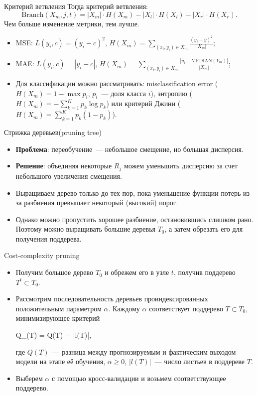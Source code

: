 \documentclass[notheorems, handout]{beamer}
\begin{document}
\begin{frame}{Критерий ветвления}
	Тогда критерий ветвления:
	\[
	\mathrm{Branch} (X _m, j, t) = |X _m| \cdot H(X _m) - |X _l| \cdot H(X _l) - |X _r| \cdot H(X _r).
	\]
	Чем больше изменение метрики, тем лучше.

	\begin{itemize}
		\item MSE: $L (y _i, c) = (y _i - c) ^2$, $H (X _m) = \sum \limits _{(x _i, y _i) \in X _m} \frac {(y _i - \overline{y}) ^2} {|X _m|}$;
		\item MAE: $L (y _i, c) = |y _i - c|$, $H (X _m) = \sum \limits _{(x _i, y _i) \in X _m} \frac {|y _i - \mathrm{MEDIAN}(Y _m)|} {|X _m|}$;
		\item Для классификации можно рассматривать: misclassification error ($H (X _m) = 1 - \max p _i$, $p _i$~--- доля класса $i$), энтропию ($H (X _m) = - \sum ^K _{k = 1} p _k \log p_k$) или критерий Джини ($H (X _m) = \sum ^K _{k = 1} p _k (1 - p_k)$).
	\end{itemize}
\end{frame}

\begin{frame}{Стрижка деревьев(pruning tree)}
	\begin{itemize}
		\item \textbf{Проблема}: переобучение~--- небольшое смещение, но большая дисперсия.\medskip
		\item \textbf{Решение}: объединяя некоторые $R_{j}$ можем уменьшить дисперсию за счет небольшого увеличения смещения.\medskip
		\item Выращиваем дерево только до тех пор, пока уменьшение функции потерь из-за разбиения превышает некоторый (высокий) порог.\medskip
		\item Однако можно пропустить хорошее разбиение, остановившись слишком рано. Поэтому можно выращивать большие деревья $T_{0}$, а затем обрезать его для получения поддерева.\medskip
	\end{itemize}
\end{frame}

\begin{frame}{Cost-complexity pruning}
	\begin{itemize}
		\item Получим большое дерево $T_{0}$ и обрежем его в узле $t$, получив поддерево $T^{t} \subset T_{0}$.\medskip
		\item Рассмотрим последовательность деревьев проиндексированных положительным параметром $\alpha$. Каждому $\alpha$ соответствует поддерево $T \subset T_{0}$, минимизирующее критерий
			\begin{flalign*}
				Q_{\alpha}(T) = Q(T) + \alpha |l(T)|,
			\end{flalign*}
		где $Q(T)$~--- разница между прогнозируемым и фактическим выходом модели на этапе её обучения, $\alpha \geq 0$, $|l(T)|$~--- число листьев в поддереве $T$.\medskip
		\item Выберем $\alpha$ с помощью кросс-валидации и возьмем соответствующее поддерево.
	\end{itemize}
\end{frame}
\end{document}
